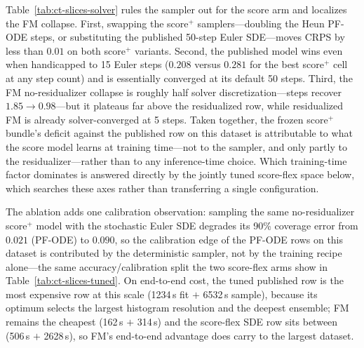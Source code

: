 \documentclass{article}
\begin{document}
Table~\ref{tab:ct-slices-solver} rules the sampler out for the score arm and localizes the FM collapse. First, swapping the score$^+$ samplers---doubling the Heun PF-ODE steps, or substituting the published 50-step Euler SDE---moves CRPS by less than $0.01$ on both score$^+$ variants. Second, the published model wins even when handicapped to 15 Euler steps ($0.208$ versus $0.281$ for the best score$^+$ cell at any step count) and is essentially converged at its default 50 steps. Third, the FM no-residualizer collapse is roughly half solver discretization---steps recover $1.85 \to 0.98$---but it plateaus far above the residualized row, while residualized FM is already solver-converged at 5 steps. Taken together, the frozen score$^+$ bundle's deficit against the published row on this dataset is attributable to what the score model learns at training time---not to the sampler, and only partly to the residualizer---rather than to any inference-time choice. Which training-time factor dominates is answered directly by the jointly tuned score-flex space below, which searches these axes rather than transferring a single configuration.

The ablation adds one calibration observation: sampling the same no-residualizer score$^+$ model with the stochastic Euler SDE degrades its 90\% coverage error from $0.021$ (PF-ODE) to $0.090$, so the calibration edge of the PF-ODE rows on this dataset is contributed by the deterministic sampler, not by the training recipe alone---the same accuracy/calibration split the two score-flex arms show in Table~\ref{tab:ct-slices-tuned}. On end-to-end cost, the tuned published row is the most expensive row at this scale (1234\,s fit $+$ 6532\,s sample), because its optimum selects the largest histogram resolution and the deepest ensemble; FM remains the cheapest (162\,s $+$ 314\,s) and the score-flex SDE row sits between (506\,s $+$ 2628\,s), so FM's end-to-end advantage does carry to the largest dataset.
\end{document}
